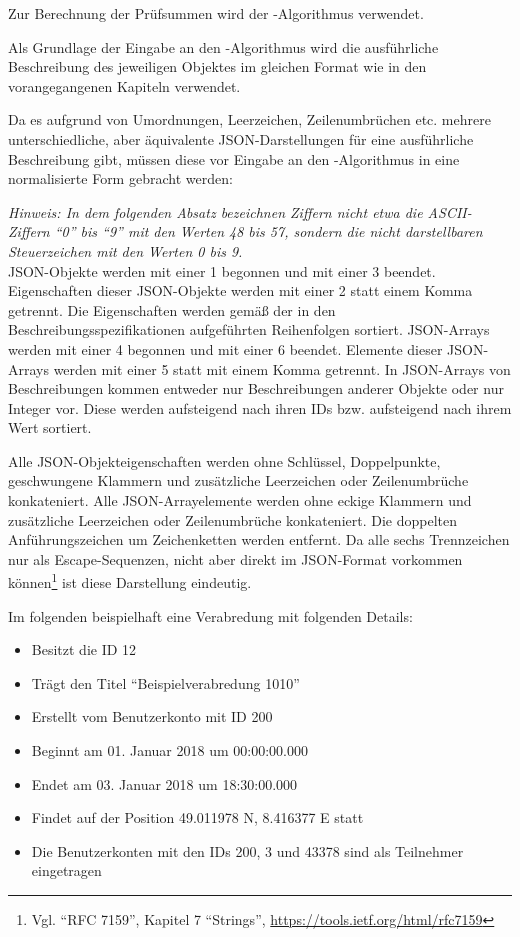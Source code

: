 \documentclass[parskip=full,11pt]{scrartcl}
\begin{document}
\par Zur Berechnung der Prüfsummen wird der \hashAlg-Algorithmus verwendet.

\par Als Grundlage der Eingabe an den \hashAlg-Algorithmus wird die
ausführliche Beschreibung des jeweiligen Objektes im gleichen Format wie in den
vorangegangenen Kapiteln verwendet.

\par Da es aufgrund von Umordnungen, Leerzeichen, Zeilenumbrüchen etc. mehrere
unterschiedliche, aber äquivalente JSON-Darstellungen für eine ausführliche
Beschreibung gibt, müssen diese vor Eingabe an den \hashAlg-Algorithmus in eine
normalisierte Form gebracht werden:

\par \textit{Hinweis: In dem folgenden Absatz bezeichnen Ziffern nicht etwa die
ASCII-Ziffern \enquote{0} bis \enquote{9} mit den Werten 48 bis 57, sondern die
nicht darstellbaren Steuerzeichen mit den Werten 0 bis 9.}\\
JSON-Objekte werden mit einer 1 begonnen und mit einer 3 beendet.
Eigenschaften dieser JSON-Objekte werden mit einer 2 statt einem Komma
getrennt.
Die Eigenschaften werden gemäß der in den Beschreibungsspezifikationen
aufgeführten Reihenfolgen sortiert.
JSON-Arrays werden mit einer 4 begonnen und mit einer 6 beendet.
Elemente dieser JSON-Arrays werden mit einer 5 statt mit einem Komma getrennt.
In JSON-Arrays von Beschreibungen kommen entweder nur Beschreibungen anderer
Objekte oder nur Integer vor.
Diese werden aufsteigend nach ihren IDs bzw. aufsteigend nach ihrem Wert
sortiert.

Alle JSON-Objekteigenschaften werden ohne Schlüssel, Doppelpunkte, geschwungene
Klammern und zusätzliche Leerzeichen oder Zeilenumbrüche konkateniert.
Alle JSON-Arrayelemente werden ohne eckige Klammern und zusätzliche
Leerzeichen oder Zeilenumbrüche konkateniert.
Die doppelten Anführungszeichen um Zeichenketten werden entfernt.
Da alle sechs Trennzeichen nur als Escape-Sequenzen, nicht aber direkt im
JSON-Format vorkommen können\footnote{Vgl. \enquote{RFC 7159}, Kapitel 7
\enquote{Strings}, \url{https://tools.ietf.org/html/rfc7159}} ist diese
Darstellung eindeutig.

\par Im folgenden beispielhaft eine Verabredung mit folgenden Details:
\begin{itemize}
    \item Besitzt die ID 12
    \item Trägt den Titel \enquote{Beispielverabredung 1010}
    \item Erstellt vom Benutzerkonto mit ID 200
    \item Beginnt am 01. Januar 2018 um 00:00:00.000
    \item Endet am 03. Januar 2018 um 18:30:00.000
    \item Findet auf der Position 49.011978 N, 8.416377 E statt
    \item Die Benutzerkonten mit den IDs 200, 3 und 43378 sind als Teilnehmer
        eingetragen
\end{itemize}
\end{document}
